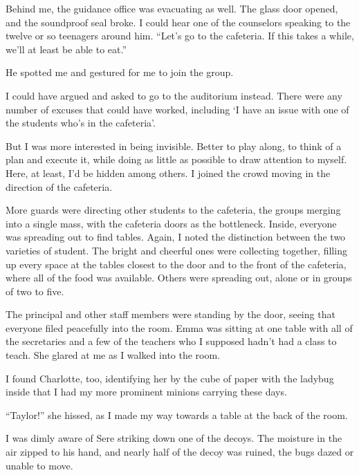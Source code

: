 Behind me, the guidance office was evacuating as well.  The glass door opened, and the soundproof seal broke.  I could hear one of the counselors speaking to the twelve or so teenagers around him.  ``Let's go to the cafeteria.  If this takes a while, we'll at least be able to eat.''



He spotted me and gestured for me to join the group.



I could have argued and asked to go to the auditorium instead.  There were any number of excuses that could have worked, including `I have an issue with one of the students who's in the cafeteria'.



But I was more interested in being invisible.  Better to play along, to think of a plan and execute it, while doing as little as possible to draw attention to myself.  Here, at least, I'd be hidden among others.  I joined the crowd moving in the direction of the cafeteria.



More guards were directing other students to the cafeteria, the groups merging into a single mass, with the cafeteria doors as the bottleneck.  Inside, everyone was spreading out to find tables.  Again, I noted the distinction between the two varieties of student.  The bright and cheerful ones were collecting together, filling up every space at the tables closest to the door and to the front of the cafeteria, where all of the food was available.  Others were spreading out, alone or in groups of two to five.



The principal and other staff members were standing by the door, seeing that everyone filed peacefully into the room.  Emma was sitting at one table with all of the secretaries and a few of the teachers who I supposed hadn't had a class to teach.  She glared at me as I walked into the room.



I found Charlotte, too, identifying her by the cube of paper with the ladybug inside that I had my more prominent minions carrying these days.



``Taylor!'' she hissed, as I made my way towards a table at the back of the room.



I was dimly aware of Sere striking down one of the decoys.  The moisture in the air zipped to his hand, and nearly half of the decoy was ruined, the bugs dazed or unable to move.



